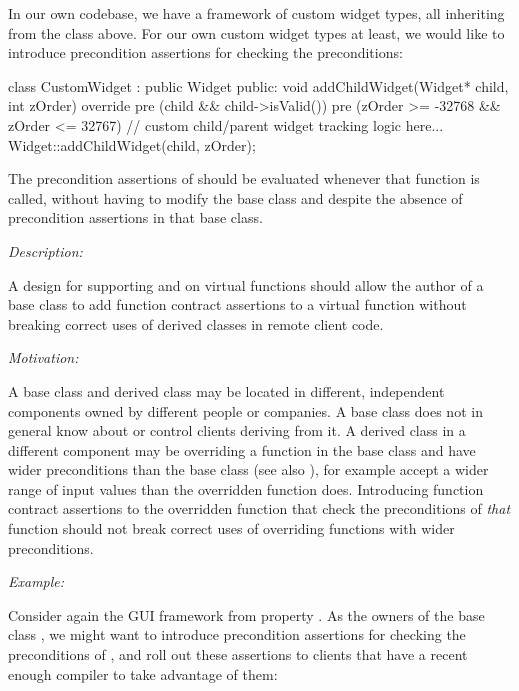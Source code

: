 In our own codebase, we have a framework of custom widget types, all inheriting from the  class above. For our own custom widget types at least, we would like to introduce precondition assertions for checking the preconditions:
\begin{codeblock}
class CustomWidget : public Widget {
public:
  void addChildWidget(Widget* child, int zOrder) override
    pre (child && child->isValid())
    pre (zOrder >= -32768 && zOrder <= 32767) 
  {
    // custom child/parent widget tracking logic here...
    Widget::addChildWidget(child, zOrder);
  }
}
\end{codeblock}

The precondition assertions of \allowbreak{} should be evaluated whenever that function is called, without having to modify the  base class and despite the absence of precondition assertions in that base class.


\emph{Description:}

A design for supporting  and  on virtual functions should allow the author of a base class to add function contract assertions to a virtual function without breaking correct uses of derived classes in remote client code.

\emph{Motivation:}

A base class and derived class may be located in different, independent components owned by different people or companies. A base class does not in general know about or control clients deriving from it. A derived class in a different component may be overriding a function in the base class and have wider preconditions than the base class (see also ), for example accept a wider range of input values than the overridden function does. Introducing function contract assertions to the overridden function that check the preconditions of \emph{that} function should not break correct uses of overriding functions with wider preconditions.



\emph{Example:}

Consider again the GUI framework from property . As the owners of the base class , we might want to introduce precondition assertions for checking the preconditions of \allowbreak{}, and roll out these assertions to clients that have a recent enough compiler to take advantage of them: 

